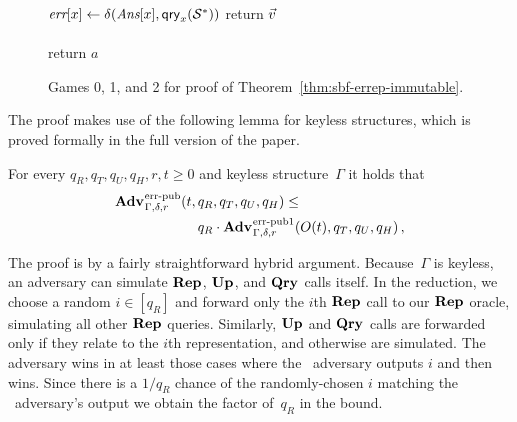 {\begin{figure*}
{{    \tab\tab $\textit{err}[x] \gets \delta(\textit{Ans}[x],\mathsf{qry}_x(\mathcal{S}^*))$
    }
    return $\vec{v}$
}
{
  \vspace{-7pt}
  \
      \hfill {} \\[2pt]
    \\[2pt]
    return $a$
}
\caption{Games 0, 1, and 2 for proof of Theorem~\ref{thm:sbf-errep-immutable}.}
\label{fig:sbf-errep-immutable/games}
\end{figure*}}

The proof makes use of the following lemma for keyless structures, which is
proved formally in the full version of the paper.

\begin{lemma}\label{thm:lemma1}
  For every $q_R, q_T, q_U, q_H, r, t \geq 0$ and keyless structure~$\Gamma$ it
  holds that
  \begin{eqnarray*}
    \begin{aligned}
      \Adv{\errep}_{\Gamma,\delta,r}(t,\,&q_R, q_T, q_U, q_H) \leq \\
      & q_R \cdot \Adv{\errep1}_{\Gamma,\delta,r}(O(t), q_T, q_U, q_H) \,,
    \end{aligned}
  \end{eqnarray*}
\end{lemma}
%
\noindent
The proof is by a fairly straightforward hybrid argument.
Because~$\Gamma$ is keyless, an  adversary can simulate $\textup{\textbf{Rep}}\hspace{0.5pt}$, $\textup{\textbf{Up}}\hspace{0.5pt}$,
and $\textup{\textbf{Qry}}\hspace{0.5pt}$ calls itself. In the reduction, we choose a random $i \in [q_R]$ and
forward only the $i$th $\textup{\textbf{Rep}}\hspace{0.5pt}$ call to our $\textup{\textbf{Rep}}\hspace{0.5pt}$ oracle, simulating all other
$\textup{\textbf{Rep}}\hspace{0.5pt}$ queries. Similarly, $\textup{\textbf{Up}}\hspace{0.5pt}$ and $\textup{\textbf{Qry}}\hspace{0.5pt}$ calls are forwarded only if they
relate to the $i$th representation, and otherwise are simulated. The \errep1
adversary wins in at least those cases where the \errep\ adversary outputs $i$
and then wins. Since there is a $1/q_R$ chance of the randomly-chosen $i$
matching the \errep\ adversary's output we obtain the factor of~$q_R$ in the
bound.

